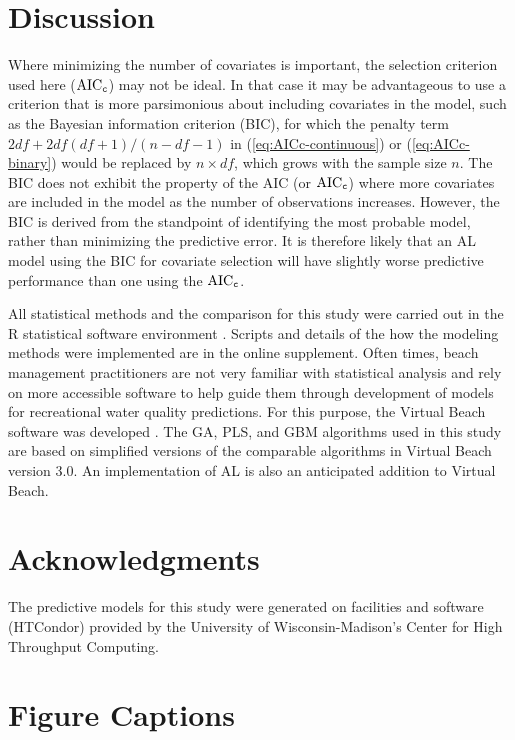 \documentclass[authoryear,review, 12pt]{elsarticle}
\begin{document}
\section{Discussion}

Where minimizing the number of covariates is important, the selection
criterion used here (\(\text{AIC}_{\tt c}\)) may not be ideal. In that
case it may be advantageous to use a criterion that is more parsimonious
about including covariates in the model, such as the Bayesian
information criterion (BIC), for which the penalty term
\(2df + 2df(df+1)/(n-df-1)\) in (\ref{eq:AICc-continuous}) or
(\ref{eq:AICc-binary}) would be replaced by \(n \times df\), which grows
with the sample size \(n\). The BIC does not exhibit the property of the
AIC (or \(\text{AIC}_{\tt c}\)) where more covariates are included in
the model as the number of observations increases. However, the BIC is
derived from the standpoint of identifying the most probable model,
rather than minimizing the predictive error. It is therefore likely that
an AL model using the BIC for covariate selection will have slightly
worse predictive performance than one using the \(\text{AIC}_{\tt c}\).

All statistical methods and the comparison for this study were carried
out in the R statistical software environment \citep{R-2014}. Scripts and
details of the how the modeling methods were implemented are in the
online supplement. Often times, beach management practitioners are not
very familiar with statistical analysis and rely on more accessible
software to help guide them through development of models for
recreational water quality predictions. For this purpose, the Virtual
Beach software was developed \citep{VB3-2013}. The GA, PLS, and GBM
algorithms used in this study are based on simplified versions of the
comparable algorithms in Virtual Beach version 3.0. An implementation of
AL is also an anticipated addition to Virtual Beach.

\section{Acknowledgments}\label{acknowledgments}

The predictive models for this study were generated on facilities and
software (HTCondor) provided by the University of Wisconsin-Madison's
Center for High Throughput Computing.

\section{Figure Captions}
\end{document}
